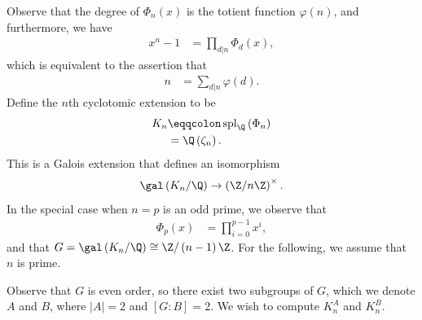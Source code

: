 \documentclass[10pt]{mypackage}
\begin{document}
Observe that the degree of $\Phi_n(x)$ is the totient function $\varphi(n)$, and furthermore, we have
\begin{align*}
  x^{n} - 1 &= \prod_{d | n} \Phi_d(x),
\end{align*}
which is equivalent to the assertion that
\begin{align*}
  n &= \sum_{d|n} \varphi(d).
\end{align*}
Define the $n$th cyclotomic extension to be
\begin{align*}
  K_n &\eqqcolon \operatorname{spl}_{\Q}\left( \Phi_n \right)\\
      &= \Q\left( \zeta_n \right).
\end{align*}
This is a Galois extension that defines an isomorphism
\begin{align*}
  \gal\left( K_n/\Q \right)\rightarrow \left( \Z/n\Z \right)^{\times}.
\end{align*}
In the special case when $n = p$ is an odd prime, we observe that
\begin{align*}
  \Phi_p(x) &= \prod_{i=0}^{p-1} x^{i},
\end{align*}
and that $G = \gal\left( K_n/\Q \right)\cong \Z/\left( n-1 \right)\Z$. For the following, we assume that $n$ is prime.

Observe that $G$ is even order, so there exist two subgroups of $G$, which we denote $A$ and $B$, where $\left\vert A \right\vert = 2$ and $\left[ G:B \right] = 2$. We wish to compute $K_n^{A}$ and $K_n^{B}$.
\end{document}
